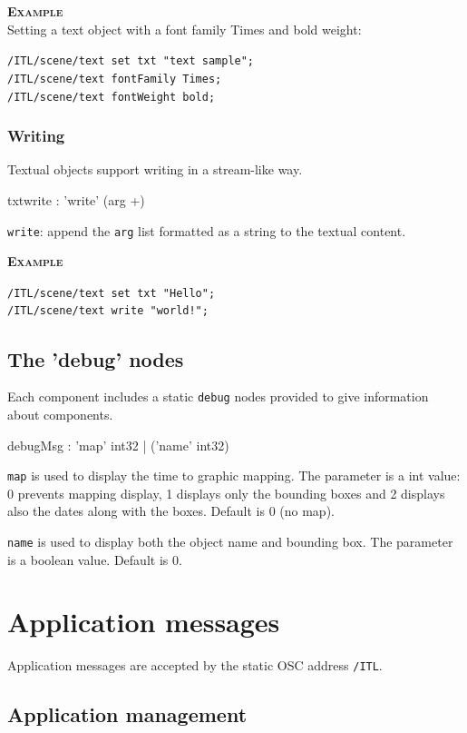 \documentclass[a4paper,twoside]{report}
\newcommand{\toplevel}[1]	{\chapter{#1}}
\newcommand{\sublevel}[1]	{\section{#1}}
\newcommand{\subsublevel}[1]	{\subsection{#1}}
\newcommand{\OSC}[1]		{\texttt{#1}}
\newcommand{\example}		{\textbf{\hspace{-1.5cm}\textbf{\textsc{Example }}}}
\let\olditemize\itemize
\let\oldenditemize\enditemize
\renewenvironment{itemize} 	{\olditemize \setlength{\itemsep}{1mm}}{\oldenditemize}
\newcommand{\sample}	[1]			{\vspace{-2mm}\begin{center}\colorbox{mygrey}{
								\begin{minipage}[t]{0.9\columnwidth} 
								{\small \texttt{#1}}
								\end{minipage}}\end{center}}
\begin{document}
\example \\
Setting a text object with a font family Times and bold weight:
\sample{/ITL/scene/text set txt "text sample";\\
/ITL/scene/text fontFamily Times;\\
/ITL/scene/text fontWeight bold;  
}

\subsublevel{Writing}
\label{txtwrite}
Textual objects support writing in a stream-like way.
\begin{rail}
txtwrite :  'write' (arg +)
\end{rail}

\begin{itemize}
\item \OSC{write}: append the \OSC{arg} list formatted as a string to the textual content.
\end{itemize}

\example \\
\sample{/ITL/scene/text set txt "Hello";\\
/ITL/scene/text write "world!";
}


\sublevel{The 'debug' nodes}
\label{debugnode}

Each component includes a static \OSC{debug} nodes provided to give information about components.
\begin{rail}
debugMsg : 'map' int32
		| ('name' int32) 
\end{rail}

\begin{itemize}
\item \OSC{map} is used to display the time to graphic mapping. The parameter is a int value: 0 prevents mapping display, 1 displays only the bounding boxes and 2 displays also the dates along with the boxes. Default is 0 (no map).
\item \OSC{name} is used to display both the object name and bounding box. The parameter is a boolean value. Default is 0.
\end{itemize}


\toplevel{Application messages}
\label{ITL}
Application messages are accepted by the static OSC address \OSC{/ITL}. 


\sublevel{Application management}
\label{applmgmt}
\end{document}
